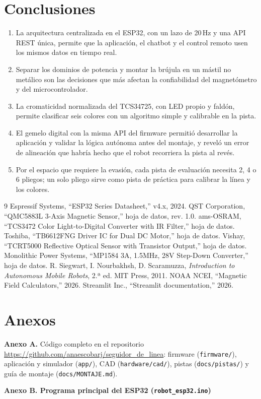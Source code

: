 \documentclass[10pt,a4paper,twocolumn]{article}
\begin{document}
\section{Conclusiones}
\begin{enumerate}
\item La arquitectura centralizada en el ESP32, con un lazo de 20\,Hz y una API REST única, permite que la aplicación, el chatbot y el control remoto usen los mismos datos en tiempo real.
\item Separar los dominios de potencia y montar la brújula en un mástil no metálico son las decisiones que más afectan la confiabilidad del magnetómetro y del microcontrolador.
\item La cromaticidad normalizada del TCS34725, con LED propio y faldón, permite clasificar seis colores con un algoritmo simple y calibrable en la pista.
\item El gemelo digital con la misma API del firmware permitió desarrollar la aplicación y validar la lógica autónoma antes del montaje, y reveló un error de alineación que habría hecho que el robot recorriera la pista al revés.
\item Por el espacio que requiere la evasión, cada pista de evaluación necesita 2, 4 o 6 pliegos; un solo pliego sirve como pista de práctica para calibrar la línea y los colores.
\end{enumerate}

\begin{thebibliography}{9}\small
{} Espressif Systems, ``ESP32 Series Datasheet,'' v4.x, 2024.
 QST Corporation, ``QMC5883L 3-Axis Magnetic Sensor,'' hoja de datos, rev. 1.0.
 ams-OSRAM, ``TCS3472 Color Light-to-Digital Converter with IR Filter,'' hoja de datos.
 Toshiba, ``TB6612FNG Driver IC for Dual DC Motor,'' hoja de datos.
 Vishay, ``TCRT5000 Reflective Optical Sensor with Transistor Output,'' hoja de datos.
 Monolithic Power Systems, ``MP1584 3A, 1.5MHz, 28V Step-Down Converter,'' hoja de datos.
 R. Siegwart, I. Nourbakhsh, D. Scaramuzza, \emph{Introduction to Autonomous Mobile Robots}, 2.ª ed. MIT Press, 2011.
 NOAA NCEI, ``Magnetic Field Calculators,'' 2026.
 Streamlit Inc., ``Streamlit documentation,'' 2026.
\end{thebibliography}

\section*{\centering Anexos}
{\raggedright\noindent\textbf{Anexo A.} Código completo en el repositorio \url{https://github.com/anaescobarj/seguidor_de_linea}: firmware (\texttt{firmware/}), aplicación y simulador (\texttt{app/}), CAD (\texttt{hardware/cad/}), pistas (\texttt{docs/pistas/}) y guía de montaje (\texttt{docs/MONTAJE.md}).\par}

{\raggedright\noindent\textbf{Anexo B. Programa principal del ESP32 (\texttt{robot\_esp32.ino})}\par}

\end{document}
